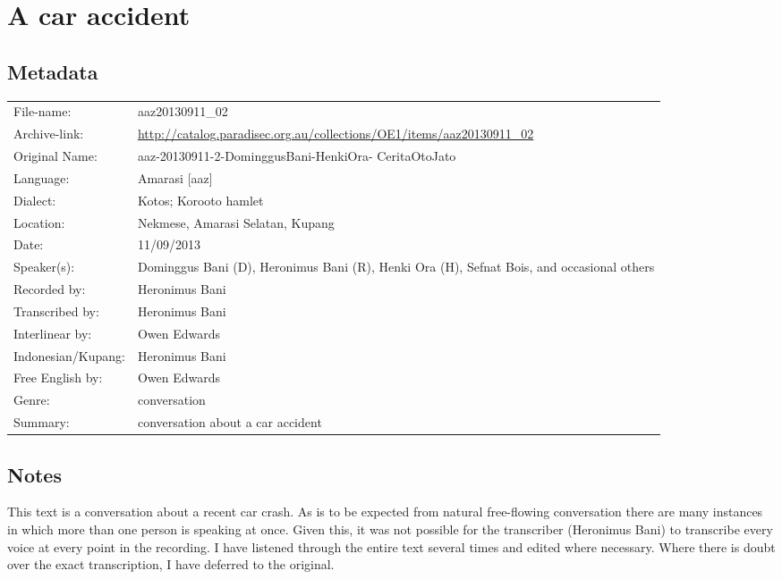 \section{A car accident}\label{sec:CarCrash}
\subsection{Metadata}

\wg\begin{tabular}{lL{.67\textwidth}}
File-name:					& aaz20130911{\_}02\\
Archive-link:				& \url{http://catalog.paradisec.org.au/collections/OE1/items/aaz20130911_02}\\
Original Name:			& aaz-20130911-2-DominggusBani-HenkiOra- CeritaOtoJato\\
Language:						& Amarasi [aaz] \\
Dialect:						& Kotos; Koro{\Q}oto hamlet \\
Location:						& Nekmese{\Q}, Amarasi Selatan, Kupang \\
Date:								&	11/09/2013\\
Speaker(s):					& Dominggus Bani (D), Heronimus Bani (R), Henki Ora (H), Sefnat Bois, and occasional others\\
Recorded by: 				& Heronimus Bani\\
Transcribed by:			& Heronimus Bani\\
Interlinear by:			& Owen Edwards \\
Indonesian/Kupang:	& Heronimus Bani\\
Free English by:		& Owen Edwards\\
Genre:							& conversation\\
Summary:						& conversation about a car accident\\
\end{tabular}

\subsection{Notes}
This text is a conversation about a recent car crash.
As is to be expected from natural free-flowing
conversation there are many instances in which more than one person is speaking at once.
Given this, it was not possible for the transcriber (Heronimus Bani)
to transcribe every voice at every point in the recording.
I have listened through the entire text several times and edited where necessary.
Where there is doubt over the exact transcription,
I have deferred to the original.

